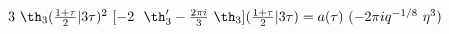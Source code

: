 \begin{equation}
  \begin{array}{l}
   3 ~\th_3({1+\tau\over 2}|3\tau)^2 ~[-2~~\th_3' -{2\pi i \over
   3}~\th_3 ]({1+\tau\over 2}|3\tau) = a(\tau)~(-2\pi i
   q^{-1/8}~\eta^3)
  \end{array}
\end{equation}

